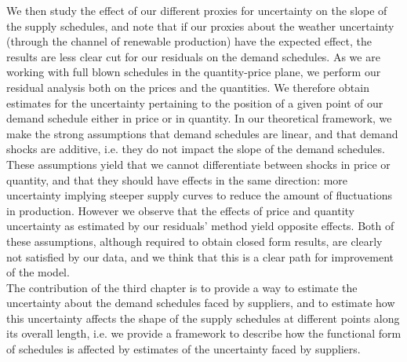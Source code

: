 We then study the effect of our different proxies for uncertainty on the slope of the supply schedules, and note that if our proxies about the weather uncertainty (through the channel of renewable production) have the expected effect, the results are less clear cut for our residuals on the demand schedules. As we are working with full blown schedules in the quantity-price plane, we perform our residual analysis both on the prices and the quantities. We therefore obtain estimates for the uncertainty pertaining to the position of a given point of our demand schedule either in price or in quantity. In our theoretical framework, we make the strong assumptions that demand schedules are linear, and that demand shocks are additive, i.e. they do not impact the slope of the demand schedules. These assumptions yield that we cannot differentiate between shocks in price or quantity, and that they should have effects in the same direction: more uncertainty implying steeper supply curves to reduce the amount of fluctuations in production. However we observe that the effects of price and quantity uncertainty as estimated by our residuals' method yield opposite effects. Both of these assumptions, although required to obtain closed form results, are clearly not satisfied by our data, and we think that this is a clear path for improvement of the model.  \\

The contribution of the third chapter is to provide a way to estimate the uncertainty about the demand schedules faced by suppliers, and to estimate how this uncertainty affects the shape of the supply schedules at different points along its overall length, i.e. we provide a framework to describe how the functional form of schedules is affected by estimates of the uncertainty faced by suppliers.\\